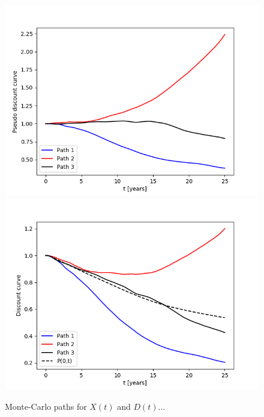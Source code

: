 \documentclass{report}
\begin{document}
\begin{figure}
\centering
\includegraphics[scale=0.7]{figures/pseudo_discount_paths.png}
\includegraphics[scale=0.7]{figures/discount_paths.png}
\caption{Monte-Carlo paths for $X(t)$ and $D(t)$...}
\end{figure}
\end{document}
